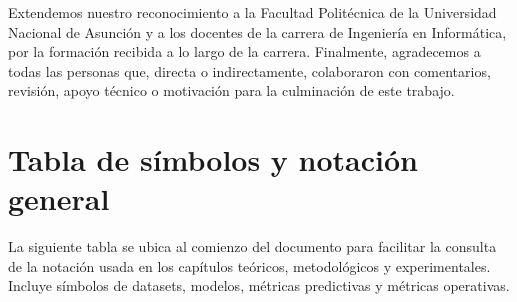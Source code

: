 \documentclass[12pt,oneside]{report}
\begin{document}
Extendemos nuestro reconocimiento a la Facultad Politécnica de la Universidad Nacional de Asunción y a los docentes de la carrera de Ingeniería en Informática, por la formación recibida a lo largo de la carrera. Finalmente, agradecemos a todas las personas que, directa o indirectamente, colaboraron con comentarios, revisión, apoyo técnico o motivación para la culminación de este trabajo.

\tableofcontents
\listoffigures
\clearpage
\chapter*{Tabla de símbolos y notación general}
{}
\label{sec:tabla-simbolos}
La siguiente tabla se ubica al comienzo del documento para facilitar la consulta de la notación usada en los capítulos teóricos, metodológicos y experimentales. Incluye símbolos de datasets, modelos, métricas predictivas y métricas operativas.
\end{document}
